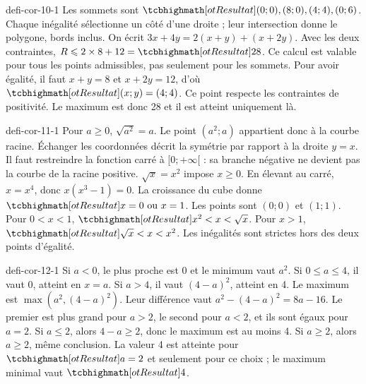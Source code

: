 \begin{blocEdition}{defi-cor-10-1}
Les sommets sont $\res{(0;0),(8;0),(4;4),(0;6)}$. Chaque inégalité sélectionne un côté d’une droite ; leur intersection donne le polygone, bords inclus.
On écrit $3x+4y=2(x+y)+(x+2y)$. Avec les deux contraintes, $R\le2\times8+12=\res{28}$. Ce calcul est valable pour tous les points admissibles, pas seulement pour les sommets.
Pour avoir égalité, il faut $x+y=8$ et $x+2y=12$, d’où $\res{(x;y)=(4;4)}$. Ce point respecte les contraintes de positivité. Le maximum est donc 28 et il est atteint uniquement là.
\label{fig-defi-cor-10}

\end{blocEdition}
\begin{blocEdition}{defi-cor-11-1}
Pour $a\ge0$, $\sqrt{a^2}=a$. Le point $(a^2;a)$ appartient donc à la courbe racine. Échanger les coordonnées décrit la symétrie par rapport à la droite $y=x$. Il faut restreindre la fonction carré à $[0;+\infty[$ : sa branche négative ne devient pas la courbe de la racine positive.
$\sqrt x=x^2$ impose $x\ge0$. En élevant au carré, $x=x^4$, donc $x(x^3-1)=0$. La croissance du cube donne $\res{x=0\text{ ou }x=1}$. Les points sont $(0;0)$ et $(1;1)$.
Pour $0<x<1$, $\res{x^2<x<\sqrt x}$. Pour $x>1$, $\res{\sqrt x<x<x^2}$. Les inégalités sont strictes hors des deux points d’égalité.
\label{fig-defi-cor-11}

\end{blocEdition}
\begin{blocEdition}{defi-cor-12-1}
Si $a<0$, le plus proche est 0 et le minimum vaut $a^2$. Si $0\le a\le4$, il vaut 0, atteint en $x=a$. Si $a>4$, il vaut $(4-a)^2$, atteint en 4.
Le maximum est $\max(a^2,(4-a)^2)$. Leur différence vaut $a^2-(4-a)^2=8a-16$. Le premier est plus grand pour $a>2$, le second pour $a<2$, et ils sont égaux pour $a=2$.
Si $a\le2$, alors $4-a\ge2$, donc le maximum est au moins 4. Si $a\ge2$, alors $a\ge2$, même conclusion. La valeur 4 est atteinte pour $\res{a=2}$ et seulement pour ce choix ; le maximum minimal vaut $\res4$.
\end{blocEdition}

